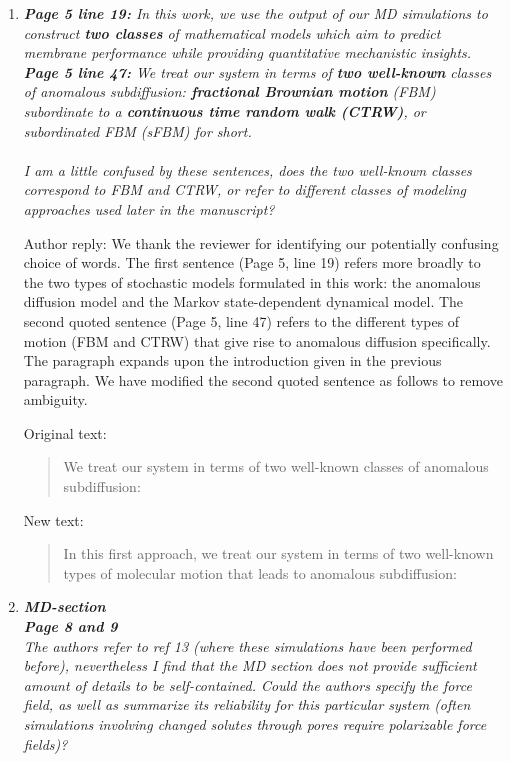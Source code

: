 \documentclass{article}
\begin{document}
\begin{enumerate}[label={Comment \theenumi :}, leftmargin=3.9\parindent]

  \item \textit{\textbf{Page 5 line 19:} In this work, we use the output of our MD simulations
        to construct \textbf{two classes} of mathematical models which aim to predict membrane 
        performance while providing quantitative mechanistic insights. \\
        \textbf{Page 5 line 47:} We treat our system in terms of \textbf{two well-known} classes of 
        anomalous subdiffusion: \textbf{fractional Brownian motion} (FBM) subordinate to a 
        \textbf{continuous time random walk (CTRW)}, or subordinated FBM (sFBM) for short. \\ \\
        I am a little confused by these sentences, does the two well-known classes correspond to FBM
        and CTRW, or refer to different classes of modeling approaches used later in the manuscript?}
  
    
  Author reply: We thank the reviewer for identifying our potentially confusing choice of words.
  The first sentence (Page 5, line 19) refers more broadly to the two types of stochastic models 
  formulated in this work: the anomalous diffusion model and the Markov state-dependent dynamical
  model. The second quoted sentence (Page 5, line 47) refers to the different types of
  motion (FBM and CTRW) that give rise to anomalous diffusion specifically. The paragraph expands
  upon the introduction given in the previous paragraph. We have modified the second quoted 
  sentence as follows to remove ambiguity.
  
  Original text:
  \begin{quote}
  We treat our system in terms of two well-known classes of anomalous subdiffusion: 
  \end{quote}
  
  New text:
  \begin{quote}
  In this first approach, we treat our system in terms of two well-known types of molecular
  motion that leads to anomalous subdiffusion: 
  \end{quote}
  
  \item \textit{\textbf{MD-section} \\
        \textbf{Page 8 and 9} \\
        The authors refer to ref 13 (where these simulations have been performed before), 
        nevertheless I find that the MD section does not provide sufficient amount of details 
        to be self-contained. Could the authors specify the force field, as well as summarize 
        its reliability for this particular system (often simulations involving changed solutes
        through pores require polarizable force fields)?
   }
        

\end{enumerate}
\end{document}
